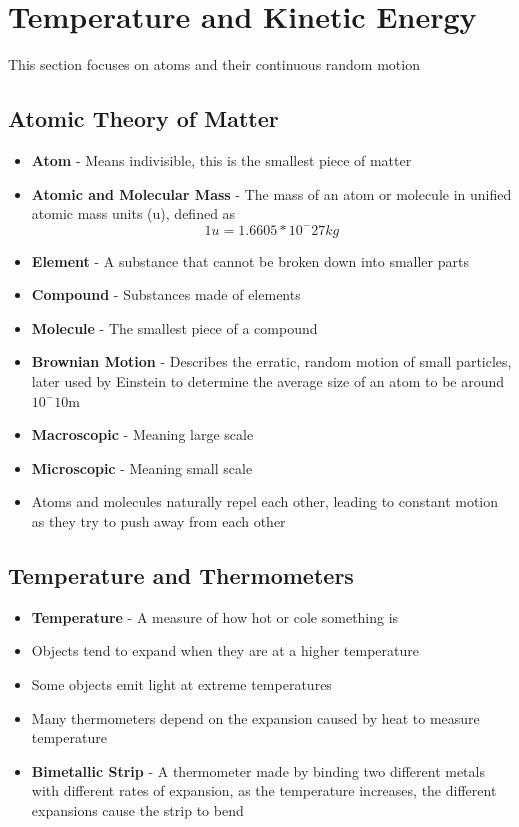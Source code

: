 \section{Temperature and Kinetic Energy}
This section focuses on atoms and their continuous random motion

\subsection{Atomic Theory of Matter}
\begin{itemize}
    \item \textbf{Atom} - Means indivisible, this is the smallest piece of matter
    \item \textbf{Atomic and Molecular Mass} - The mass of an atom or molecule in unified atomic mass units (u), defined as \[1u=1.6605*10^-27kg\]
    \item \textbf{Element} - A substance that cannot be broken down into smaller parts
    \item \textbf{Compound} - Substances made of elements
    \item \textbf{Molecule} - The smallest piece of a compound
    \item \textbf{Brownian Motion} - Describes the erratic, random motion of small particles, later used by Einstein to determine the average size of an atom to be around \(10^-10\)m
    \item \textbf{Macroscopic} - Meaning large scale
    \item \textbf{Microscopic} - Meaning small scale
    \item Atoms and molecules naturally repel each other, leading to constant motion as they try to push away from each other
\end{itemize}

\subsection{Temperature and Thermometers}
\begin{itemize}
    \item \textbf{Temperature} - A measure of how hot or cole something is
    \item Objects tend to expand when they are at a higher temperature
    \item Some objects emit light at extreme temperatures
    \item Many thermometers depend on the expansion caused by heat to measure temperature
    \item \textbf{Bimetallic Strip} - A thermometer made by binding two different metals with different rates of expansion, as the temperature increases, the different expansions cause the strip to bend
\end{itemize}

